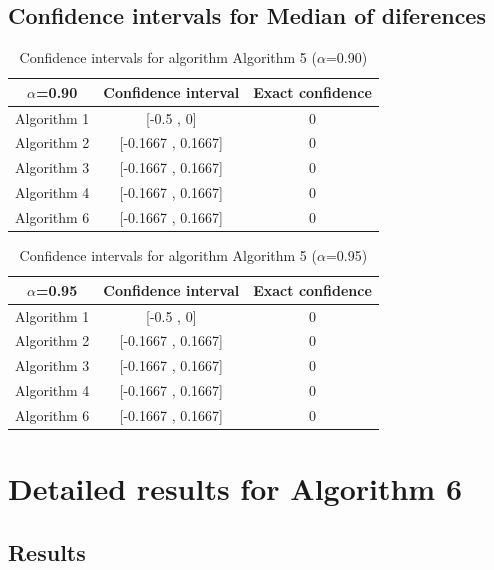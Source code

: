 \documentclass[a4paper,10pt]{article}
\begin{document}
\subsection{Confidence intervals for Median of diferences}

\begin{table}[!htp]
\centering\small
\begin{tabular}{
|c|c|c|}
\hline
 $\alpha$=0.90 & Confidence interval & Exact confidence \\ \hline 
Algorithm 1 & [-0.5 , 0] & 0\\ \hline 
Algorithm 2 & [-0.1667 , 0.1667] & 0\\ \hline 
Algorithm 3 & [-0.1667 , 0.1667] & 0\\ \hline 
Algorithm 4 & [-0.1667 , 0.1667] & 0\\ \hline 
Algorithm 6 & [-0.1667 , 0.1667] & 0\\ \hline 

\end{tabular}
\caption{Confidence intervals for algorithm Algorithm 5 ($\alpha$=0.90)}
\end{table}
\begin{table}[!htp]
\centering\small
\begin{tabular}{
|c|c|c|}
\hline
 $\alpha$=0.95 & Confidence interval & Exact confidence \\ \hline 
Algorithm 1 & [-0.5 , 0] & 0\\ \hline 
Algorithm 2 & [-0.1667 , 0.1667] & 0\\ \hline 
Algorithm 3 & [-0.1667 , 0.1667] & 0\\ \hline 
Algorithm 4 & [-0.1667 , 0.1667] & 0\\ \hline 
Algorithm 6 & [-0.1667 , 0.1667] & 0\\ \hline 

\end{tabular}
\caption{Confidence intervals for algorithm Algorithm 5 ($\alpha$=0.95)}
\end{table}

 \clearpage 


\section{Detailed results for Algorithm 6}


\subsection{Results}
\end{document}
